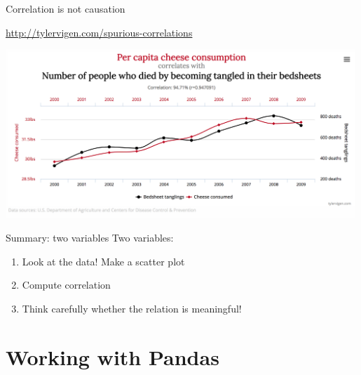 \documentclass[aspectratio=169,usenames,dvipsnames]{beamer}
\begin{document}
\begin{frame}{Correlation is not causation}
\begin{reference}\vspace{1em}
    \url{http://tylervigen.com/spurious-correlations}
\end{reference}
\includegraphics[width=0.99\textwidth]{fig/cheese}
\end{frame}

\begin{frame}{Summary: two variables}
Two  variables:
\begin{enumerate}
    \item Look at the data! Make a scatter plot
    \item Compute correlation
    \item Think carefully whether the relation is meaningful!
\end{enumerate}
\end{frame}



\section{Working with Pandas}
\frame{\tableofcontents[currentsection]}



\end{document}
